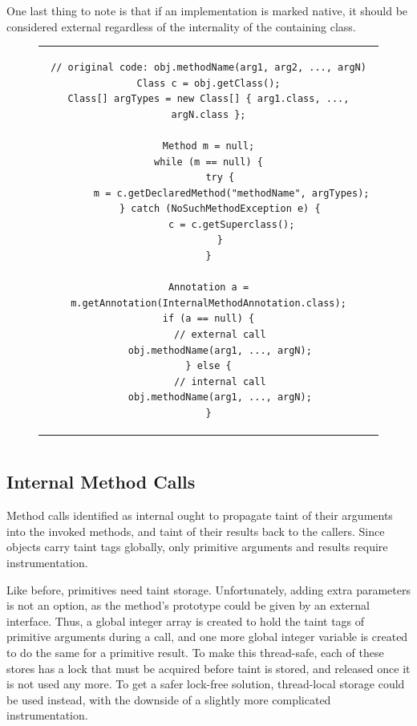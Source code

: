 \documentclass[12pt,twoside,notitlepage]{report}
\begin{document}
One last thing to note is that if an implementation is marked native, it should be considered external regardless of the internality of the containing class. 

\begin{figure}[h]
	\centering
	\begin{tabular}{c}
	\begin{lstlisting}
// original code: obj.methodName(arg1, arg2, ..., argN)
Class c = obj.getClass();
Class[] argTypes = new Class[] { arg1.class, ..., argN.class };

Method m = null;
while (m == null) {
	try {
 		m = c.getDeclaredMethod("methodName", argTypes);
 	} catch (NoSuchMethodException e) {
 		c = c.getSuperclass();
 	}
}

Annotation a = m.getAnnotation(InternalMethodAnnotation.class);
if (a == null) {
	// external call
	obj.methodName(arg1, ..., argN);
} else {
	// internal call
	obj.methodName(arg1, ..., argN);
}
	\end{lstlisting}
	\end{tabular}
	\begin{lstlisting}[caption={Destination-deciding instrumentation for non-public methods},
	                   label={listing:TaintPropagation_MethodCall_DestDecidability_NonPublic}]
	\end{lstlisting}
\end{figure}

\subsection{Internal Method Calls}
\label{section:TaintPropagation_MethodCalls_Internal}

Method calls identified as internal ought to propagate taint of their arguments into the invoked methods, and taint of their results back to the callers. Since objects carry taint tags globally, only primitive arguments and results require instrumentation. 

Like before, primitives need taint storage. Unfortunately, adding extra parameters is not an option, as the method's prototype could be given by an external interface. Thus, a global integer array is created to hold the taint tags of primitive arguments during a call, and one more global integer variable is created to do the same for a primitive result. To make this thread-safe, each of these stores has a lock that must be acquired before taint is stored, and released once it is not used any more. To get a safer lock-free solution, thread-local storage could be used instead, with the downside of a slightly more complicated instrumentation.
\end{document}
